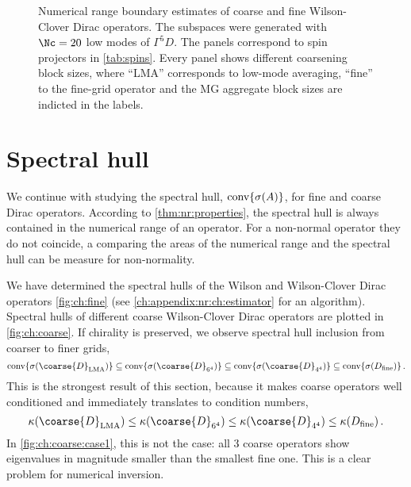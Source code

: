 \begin{figure}
\centering

\hfill
{}

\hfill
{}

\caption{
Numerical range boundary estimates of coarse and fine Wilson-Clover Dirac operators.
The subspaces were generated with $\Nc=20$ low modes of $\Gamma^{5} D$.
The panels correspond to spin projectors in \cref{tab:spins}.
Every panel shows different coarsening block sizes, where ``LMA'' corresponds to low-mode averaging, ``fine'' to the fine-grid operator and the MG aggregate block sizes are indicted in the labels.
}
\label{fig:nr:coarse}
\end{figure}

\section{Spectral hull}

We continue with studying the spectral hull, $\text{conv}\{  \sigma( A )  \}$, for fine and coarse Dirac operators.
According to \cref{thm:nr:properties}, the spectral hull is always contained in the numerical range of an operator.
For a non-normal operator they do not coincide, a comparing the areas of the numerical range and the spectral hull can be measure for non-normality.

We have determined the spectral hulls of the Wilson and Wilson-Clover Dirac operators \cref{fig:ch:fine} (see \cref{ch:appendix:nr:ch:estimator} for an algorithm).
Spectral hulls of different coarse Wilson-Clover Dirac operators are plotted in \cref{fig:ch:coarse}.
If chirality is preserved, we observe spectral hull inclusion from coarser to finer grids,
\begin{equation}
\convshull{\coarse{D}_{\text{LMA}}} \subseteq
\convshull{\coarse{D}_{6^{4}}} \subseteq
\convshull{\coarse{D}_{4^{4}}} \subseteq
\convshull{D_{\text{fine}}} \,.
\end{equation}
This is the strongest result of this section, because it makes coarse operators well conditioned
and immediately translates to condition numbers,
\begin{equation}
\kappa(\coarse{D}_{\text{LMA}}) \leq
\kappa(\coarse{D}_{6^{4}}) \leq
\kappa(\coarse{D}_{4^{4}}) \leq
\kappa(D_{\text{fine}}) \,.
\end{equation}
In \cref{fig:ch:coarse:case1}, this is not the case: all \num{3} coarse operators show eigenvalues in magnitude smaller than the smallest fine one.
This is a clear problem for numerical inversion.

